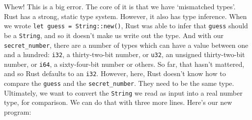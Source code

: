 \documentclass[a4paper,]{book}
\newenvironment{Shaded}{\begin{snugshade}}{\end{snugshade}}
\newcommand{\KeywordTok}[1]{\textcolor[rgb]{0.13,0.29,0.53}{\textbf{{#1}}}}
\newcommand{\NormalTok}[1]{{#1}}
\begin{document}
\begin{Shaded}
\end{Shaded}

Whew! This is a big error. The core of it is that we have `mismatched
types'. Rust has a strong, static type system. However, it also has type
inference. When we wrote \texttt{let\ guess\ =\ String::new()}, Rust was
able to infer that \texttt{guess} should be a \texttt{String}, and so it
doesn't make us write out the type. And with our
\texttt{secret\_number}, there are a number of types which can have a
value between one and a hundred: \texttt{i32}, a thirty-two-bit number,
or \texttt{u32}, an unsigned thirty-two-bit number, or \texttt{i64}, a
sixty-four-bit number or others. So far, that hasn't mattered, and so
Rust defaults to an \texttt{i32}. However, here, Rust doesn't know how
to compare the \texttt{guess} and the \texttt{secret\_number}. They need
to be the same type. Ultimately, we want to convert the \texttt{String}
we read as input into a real number type, for comparison. We can do that
with three more lines. Here's our new program:
\end{document}
